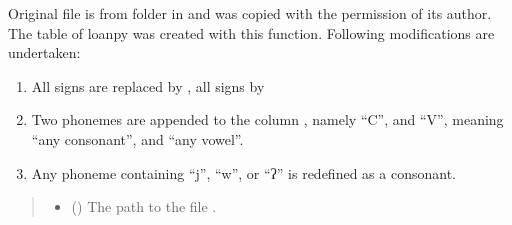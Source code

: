 \documentclass[letterpaper,10pt,english]{sphinxmanual}
\begin{document}

\begin{fulllineitems}
\label{\detokenize{documentation:loanpy.utils.modify_ipa_all}}
\pysigstartsignatures
{}
\pysigstopsignatures
\sphinxAtStartPar
Original file is  from folder  in 
and was copied with the permission of its author.
The  table of loanpy was created with this function.
Following modifications are undertaken:
\begin{enumerate}
%
\item {} 
\sphinxAtStartPar
All \sphinxcode{\sphinxupquote{+}} signs are replaced by , all \sphinxcode{\sphinxupquote{\sphinxhyphen{}}} signs by 

\item {} 
\sphinxAtStartPar
Two phonemes are appended to the column ,
namely “C”, and “V”, meaning “any consonant”, and “any vowel”.

\item {} 
\sphinxAtStartPar
Any phoneme containing “j”, “w”, or “ʔ” is redefined as a consonant.

\end{enumerate}
\begin{quote}\begin{description}
\begin{itemize}
\item {} 
\sphinxAtStartPar
{} () \textendash{} The path to the file .


\end{itemize}
\end{description}
\end{quote}
\end{fulllineitems}
\end{document}
